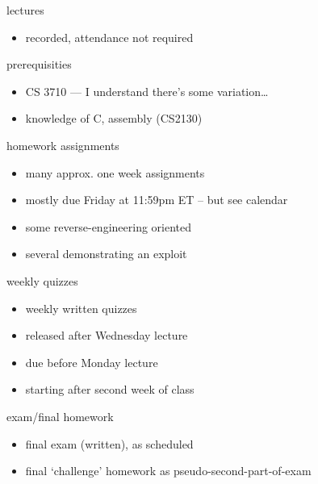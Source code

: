 \begin{frame}{lectures}
    \begin{itemize}
    \item recorded, attendance not required
    \end{itemize}
\end{frame}

\begin{frame}{prerequisities}
    \begin{itemize}
    \item CS 3710 --- I understand there's some variation\ldots
    \item knowledge of C, assembly (CS2130)
    \end{itemize}
\end{frame}

\begin{frame}{homework assignments}
\begin{itemize}
    \item many approx. one week assignments
    \item mostly due Friday at 11:59pm ET -- but see calendar
    \vspace{.5cm}
    \item some reverse-engineering oriented
    \item several demonstrating an exploit
\end{itemize}
\end{frame}

\begin{frame}{weekly quizzes}
\begin{itemize}
    \item weekly written quizzes
    \item released after Wednesday lecture
    \item due before Monday lecture
    \item starting after second week of class
\end{itemize}
\end{frame}

\begin{frame}{exam/final homework}
    \begin{itemize}
    \item final exam (written), as scheduled
    \item final `challenge' homework as pseudo-second-part-of-exam
    \end{itemize}
\end{frame}

